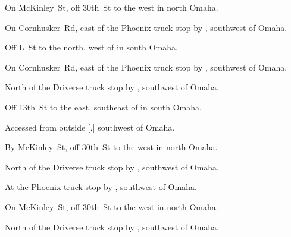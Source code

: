 
\begin{LocationList}

On  McKinley~St, off  30th~St to the west in north Omaha.

On Cornhusker~Rd, east of the Phoenix truck stop by  , southwest of Omaha.

Off  L~St to the north, west of  in south Omaha.

On Cornhusker~Rd, east of the Phoenix truck stop by  , southwest of Omaha.

\Location{\GarageHQ \Garage}
North of the Driverse truck stop by  , southwest of Omaha.

Off 13th~St to the east, southeast of  in south Omaha.

Accessed from  outside [,] southwest of Omaha.

By  McKinley~St, off  30th~St to the west in north Omaha.

North of the Driverse truck stop by  , southwest of Omaha.

At the Phoenix truck stop by  , southwest of Omaha.

On  McKinley~St, off  30th~St to the west in north Omaha.

North of the Driverse truck stop by  , southwest of Omaha.

\end{LocationList}
